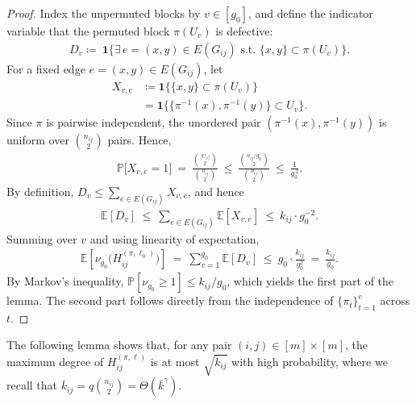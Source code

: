 \documentclass[journal]{IEEEtran}
\theoremstyle{definition}
\theoremstyle{definition}
\newcommand{\EE}{\mathbb{E}}
\newcommand{\PP}{\mathbb{P}}
\newcommand{\ER}{\mathrm{ER}}
\newcommand{\PV}{\nu}
\newcommand{\kb}{\overline{k}}
\begin{document}
\begin{proof}
Index the unpermuted blocks by \(v\in[g_0]\), and define the indicator variable that the permuted block \(\pi(U_v)\) is defective:
\begin{align*}
    D_v \coloneqq\ \mathbf{1}\Big\{\exists\, e=(x,y)\in E(G_{ij}) 
    \text{ s.t. } \{x,y\}\subset \pi(U_v)\Big\}.
\end{align*}
For a fixed edge \(e=(x,y)\in E(G_{ij})\), let
\begin{align*}
    X_{v,e} &\coloneqq \mathbf{1}\{\{x,y\}\subset \pi(U_v)\} \\
    &= \mathbf{1}\{\{\pi^{-1}(x), \pi^{-1}(y) \}\subset U_v\}.
\end{align*}
Since \(\pi\) is pairwise independent, the unordered pair \((\pi^{-1}(x),\pi^{-1}(y))\) is uniform over \(\binom{n_{ij}}{2}\) pairs. Hence,
\begin{align*}
  \PP\big[X_{v,e}=1\big]\ =\ \frac{\binom{|U_v|}{2}}{\binom{n_{ij}}{2}}
  \ \le\ \frac{\binom{n_{ij}/g_0}{2}}{\binom{n_{ij}}{2}}
  \ \le\ \frac{1}{g_0^{\,2}}.
\end{align*}
By definition, \(D_v\le \sum_{e\in E(G_{ij})} X_{v,e}\), and hence
\begin{align*}
  \EE[D_v]\ \le\ \sum_{e\in E(G_{ij})}\EE[X_{v,e}]\ \le\ k_{ij}\cdot g_0^{-2}.
\end{align*}
Summing over \(v\) and using linearity of expectation,
\begin{align*}
  \EE\left[\PV_{g_0}\big(H_{ij}^{(\pi,\ell_0)}\big)\right]\ =\ \sum_{v=1}^{g_0} \EE[D_v]\ \le\ g_0\cdot \frac{k_{ij}}{g_0^{2}}\ =\ \frac{k_{ij}}{g_0}.
\end{align*}
By Markov’s inequality, \(\PP[\PV_{g_0}\ge 1]\le k_{ij}/g_0\), which yields the first part of the lemma. The second part follows directly from the independence of \(\{\pi_t\}_{t=1}^{c}\) across $t$.
\end{proof}

The following lemma shows that, for any pair $(i,j) \in [m]\times[m]$, the maximum degree of $H_{ij}^{(\pi,\ell)}$ is at most $\sqrt{\kb_{ij}}$ with high probability, where we recall that $\kb_{ij} = q \binom{n_{ij}}{2} = \Theta(\kb^{\gamma})$.
\end{document}
